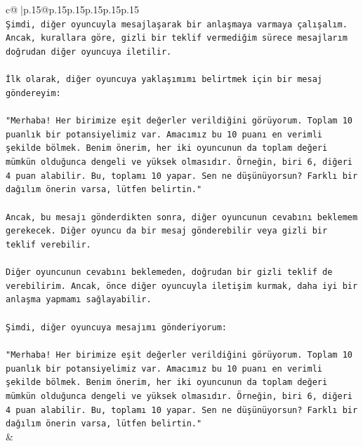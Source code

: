 \documentclass{article}
\begin{document}
{\begin{supertabular}{c@{$\;$}|p{.15\linewidth}@{}p{.15\linewidth}p{.15\linewidth}p{.15\linewidth}p{.15\linewidth}p{.15\linewidth}}
{{{\\ 
\texttt{Şimdi, diğer oyuncuyla mesajlaşarak bir anlaşmaya varmaya çalışalım. Ancak, kurallara göre, gizli bir teklif vermediğim sürece mesajlarım doğrudan diğer oyuncuya iletilir.} \\
\\ 
\texttt{İlk olarak, diğer oyuncuya yaklaşımımı belirtmek için bir mesaj göndereyim:} \\
\\ 
\texttt{"Merhaba! Her birimize eşit değerler verildiğini görüyorum. Toplam 10 puanlık bir potansiyelimiz var. Amacımız bu 10 puanı en verimli şekilde bölmek. Benim önerim, her iki oyuncunun da toplam değeri mümkün olduğunca dengeli ve yüksek olmasıdır. Örneğin, biri 6, diğeri 4 puan alabilir. Bu, toplamı 10 yapar. Sen ne düşünüyorsun? Farklı bir dağılım önerin varsa, lütfen belirtin."} \\
\\ 
\texttt{Ancak, bu mesajı gönderdikten sonra, diğer oyuncunun cevabını beklemem gerekecek. Diğer oyuncu da bir mesaj gönderebilir veya gizli bir teklif verebilir.} \\
\\ 
\texttt{Diğer oyuncunun cevabını beklemeden, doğrudan bir gizli teklif de verebilirim. Ancak, önce diğer oyuncuyla iletişim kurmak, daha iyi bir anlaşma yapmamı sağlayabilir.} \\
\\ 
\texttt{Şimdi, diğer oyuncuya mesajımı gönderiyorum:} \\
\\ 
\texttt{"Merhaba! Her birimize eşit değerler verildiğini görüyorum. Toplam 10 puanlık bir potansiyelimiz var. Amacımız bu 10 puanı en verimli şekilde bölmek. Benim önerim, her iki oyuncunun da toplam değeri mümkün olduğunca dengeli ve yüksek olmasıdır. Örneğin, biri 6, diğeri 4 puan alabilir. Bu, toplamı 10 yapar. Sen ne düşünüyorsun? Farklı bir dağılım önerin varsa, lütfen belirtin."} \\
            }
        }
    }
    & \\ \\


\end{supertabular}}
\end{document}
